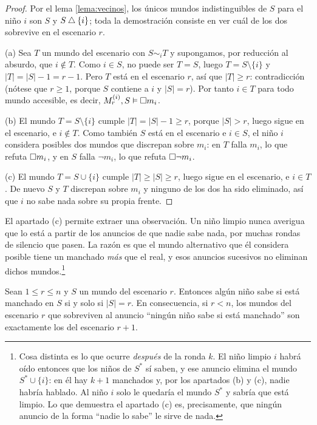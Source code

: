 \begin{proof}
Por el lema \ref{lema:vecinos}, los únicos mundos indistinguibles de $S$ para el niño $i$ son $S$ y $S \mathbin{\triangle} \{i\}$; toda la demostración consiste en ver cuál de los dos sobrevive en el escenario $r$.

(a) Sea $T$ un mundo del escenario con $S \sim_i T$ y supongamos, por reducción al absurdo, que $i \notin T$. Como $i \in S$, no puede ser $T = S$, luego $T = S \setminus \{i\}$ y $|T| = |S| - 1 = r-1$. Pero $T$ está en el escenario $r$, así que $|T| \ge r$: contradicción (nótese que $r \ge 1$, porque $S$ contiene a $i$ y $|S| = r$). Por tanto $i \in T$ para todo mundo accesible, es decir, $M_r^{(i)}, S \vDash \square m_i$.

(b) El mundo $T = S \setminus \{i\}$ cumple $|T| = |S| - 1 \ge r$, porque $|S| > r$, luego sigue en el escenario, e $i \notin T$. Como también $S$ está en el escenario e $i \in S$, el niño $i$ considera posibles dos mundos que discrepan sobre $m_i$: en $T$ falla $m_i$, lo que refuta $\square m_i$, y en $S$ falla $\lnot m_i$, lo que refuta $\square\lnot m_i$.

(c) El mundo $T = S \cup \{i\}$ cumple $|T| \ge |S| \ge r$, luego sigue en el escenario, e $i \in T$. De nuevo $S$ y $T$ discrepan sobre $m_i$ y ninguno de los dos ha sido eliminado, así que $i$ no sabe nada sobre su propia frente.
\end{proof}

El apartado (c) permite extraer una observación. Un niño limpio nunca averigua que lo está a partir de los anuncios de que nadie sabe nada, por muchas rondas de silencio que pasen. La razón es que el mundo alternativo que él considera posible tiene un manchado \emph{más} que el real, y esos anuncios sucesivos no eliminan dichos mundos.\footnote{Cosa distinta es lo que ocurre \emph{después} de la ronda $k$. El niño limpio $i$ habrá oído entonces que los niños de $S^{*}$ sí saben, y ese anuncio elimina el mundo $S^{*}\cup\{i\}$: en él hay $k+1$ manchados y, por los apartados (b) y (c), nadie habría hablado. Al niño $i$ solo le quedaría el mundo $S^{*}$ y sabría que está limpio. Lo que demuestra el apartado (c) es, precisamente, que ningún anuncio de la forma ``nadie lo sabe'' le sirve de nada.}

\begin{corolario}\label{cor:ronda}
Sean $1 \le r \le n$ y $S$ un mundo del escenario $r$. Entonces algún niño sabe si está manchado en $S$ si y solo si $|S| = r$. En consecuencia, si $r < n$, los mundos del escenario $r$ que sobreviven al anuncio ``ningún niño sabe si está manchado'' son exactamente los del escenario $r+1$.
\end{corolario}

